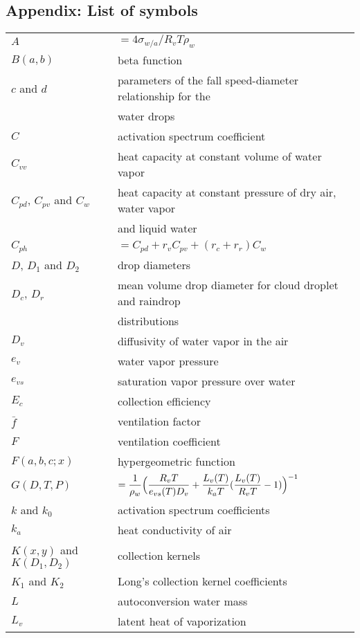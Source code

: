 \subsection*{Appendix: List of symbols}
\setlongtables
\begin{longtable}{ll}
$A$&$=4\sigma_{w/a}/R_v T\rho_w$\\
$B(a,b)$&beta function\\
$c$ and $d$&parameters of the fall speed-diameter relationship for the\\
           &water drops\\
$C$&activation spectrum coefficient\\
$C_{vv}$&heat capacity at constant volume of water vapor\\
$C_{pd}$, $C_{pv}$ and $C_{w}$&heat capacity at constant pressure of dry air, water vapor\\
                              &and liquid water\\
$C_{ph}$&$=C_{pd}+r_v C_{pv}+(r_c+r_r)C_{w}$\\
$D$, $D_1$ and $D_2$&drop diameters\\
$D_c$, $D_r$&mean volume drop diameter for cloud droplet and raindrop\\
            &distributions\\
$D_v$&diffusivity of water vapor in the air\\
$e_v$&water vapor pressure\\
$e_{vs}$&saturation vapor pressure over water\\
$E_c$&collection efficiency\\
$\bar f$&ventilation factor\\
$F$&ventilation coefficient\\
$F(a,b,c;x)$&hypergeometric function\\
$G(D,T,P)$&$=\displaystyle{{1 \over \rho_w}\Big({R_v T \over e_{vs}(T) D_v} +
{L_v(T) \over k_a T}({L_v(T) \over R_v T} -1)\Big)^{-1}}$\\
$k$ and $k_0$&activation spectrum coefficients\\
$k_a$&heat conductivity of air\\
$K(x,y)$ and $K(D_1,D_2)$&collection kernels\\
$K_1$ and $K_2$&Long's collection kernel coefficients\\
$L$&autoconversion water mass\\
$L_v$&latent heat of vaporization\\

\end{longtable}
